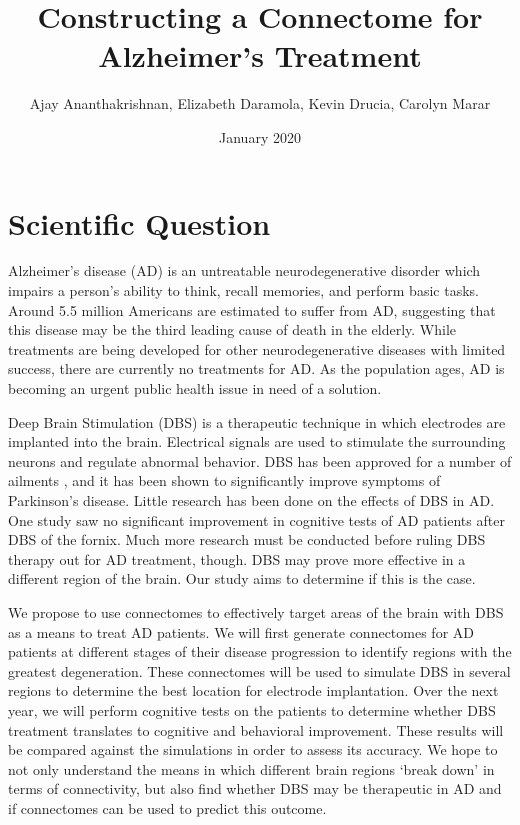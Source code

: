 \documentclass{article}
\title{Constructing a Connectome for Alzheimer's Treatment}
\author{Ajay Ananthakrishnan, Elizabeth Daramola, Kevin Drucia, Carolyn Marar }
\date{January 2020}
\begin{document}
\maketitle

\section{Scientific Question}
Alzheimer's disease (AD) is an untreatable neurodegenerative disorder which impairs a person's ability to think, recall memories, and perform basic tasks. Around 5.5 million Americans are estimated to suffer from AD, suggesting that this disease may be the third leading cause of death in the elderly. \cite{Alzheimer's Facts} While treatments are being developed for other neurodegenerative diseases with limited success, there are currently no treatments for AD. As the population ages, AD is becoming an urgent public health issue in need of a solution.

Deep Brain Stimulation (DBS) is a therapeutic technique in which electrodes are implanted into the brain. Electrical signals are used to stimulate the surrounding neurons and regulate abnormal behavior. DBS has been approved for a number of ailments \cite{DBS uses}, and it has been shown to significantly improve symptoms of Parkinson's disease. \cite{DBS PD} Little research has been done on the effects of DBS in AD. One study saw no significant improvement in cognitive tests of AD patients after DBS of the fornix. \cite{DBS AD} Much more research must be conducted before ruling DBS therapy out for AD treatment, though. DBS may prove more effective in a different region of the brain. Our study aims to determine if this is the case.

We propose to use connectomes to effectively target areas of the brain with DBS as a means to treat AD patients. We will first generate connectomes for AD patients at different stages of their disease progression to identify regions with the greatest degeneration. These connectomes will be used to simulate DBS in several regions to determine the best location for electrode implantation. Over the next year, we will perform cognitive tests on the patients to determine whether DBS treatment translates to cognitive and behavioral improvement. These results will be compared against the simulations in order to assess its accuracy. We hope to not only understand the means in which different brain regions ‘break down’ in terms of connectivity, but also find whether DBS may be therapeutic in AD and if connectomes can be used to predict this outcome. 
\end{document}
